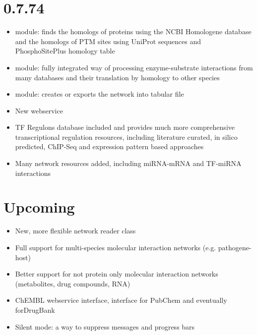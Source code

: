\documentclass[letterpaper,10pt,english]{sphinxmanual}
\begin{document}
\section{0.7.74}
\label{\detokenize{changelog:id6}}\begin{itemize}
\item {} 
 module: finds the homologs of proteins using the NCBI
Homologene database and the homologs of PTM sites using UniProt sequences
and PhosphoSitePlus homology table

\item {} 
 module: fully integrated way of processing enzyme-substrate
interactions from many databases and their translation by homology to other
species

\item {} 
 module: creates  or exports the network into
tabular file

\item {} 
New webservice

\item {} 
TF Regulons database included and provides much more comprehensive
transcriptional regulation resources, including literature curated, in silico
predicted, ChIP-Seq and expression pattern based approaches

\item {} 
Many network resources added, including miRNA-mRNA and TF-miRNA interactions

\end{itemize}


\section{Upcoming}
\label{\detokenize{changelog:upcoming}}\begin{itemize}
\item {} 
New, more flexible network reader class

\item {} 
Full support for multi-species molecular interaction networks
(e.g. pathogene-host)

\item {} 
Better support for not protein only molecular interaction networks
(metabolites, drug compounds, RNA)

\item {} 
ChEMBL webservice interface, interface for PubChem and eventually
forDrugBank

\item {} 
Silent mode: a way to suppress messages and progress bars

\end{itemize}
\end{document}
